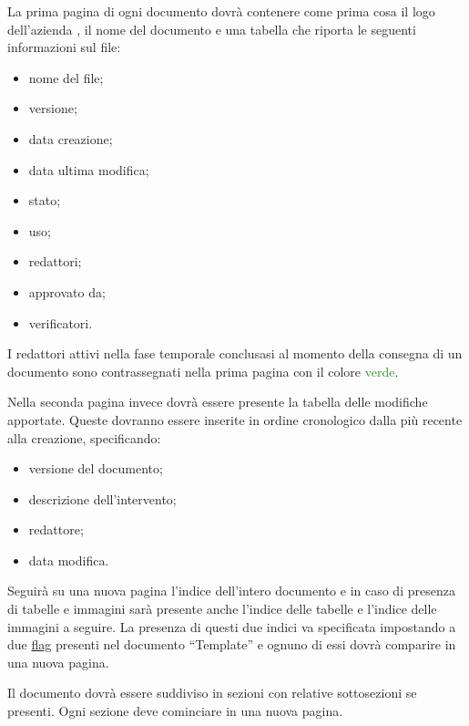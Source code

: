 La prima pagina di ogni documento dovrà contenere come prima cosa il logo dell'azienda \team{}, il nome del documento e una tabella che riporta le seguenti informazioni sul file:
\begin{itemize}
\item nome del file;
\item versione;
\item data creazione;
\item data ultima modifica;
\item stato;
\item uso;
\item redattori;
\item approvato da;
\item verificatori.
\end{itemize}

I redattori attivi nella fase temporale conclusasi al momento della consegna di un documento sono contrassegnati nella prima pagina con il colore \textcolor{ForestGreen}{verde}. 

Nella seconda pagina invece dovrà essere presente la tabella delle modifiche apportate. Queste dovranno essere inserite in ordine cronologico dalla più recente alla creazione, specificando:
\begin{itemize}
\item versione del documento;
\item descrizione dell'intervento;
\item redattore;
\item data modifica.
\end{itemize}

Seguirà su una nuova pagina l'indice dell'intero documento e in caso di presenza di tabelle e immagini sarà presente anche l'indice delle tabelle e l'indice delle immagini a seguire. La presenza di questi due indici va specificata impostando a  due \underline{flag} presenti nel documento ``Template'' e ognuno di essi dovrà comparire in una nuova pagina.

Il documento dovrà essere suddiviso in sezioni con relative sottosezioni se presenti. Ogni sezione deve cominciare in una nuova pagina.

